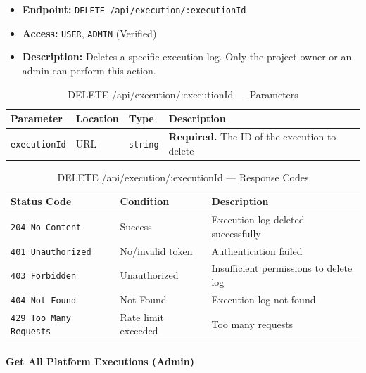 \begin{itemize}
  \item \textbf{Endpoint:} \texttt{DELETE /api/execution/:executionId}
  \item \textbf{Access:} \texttt{USER}, \texttt{ADMIN} (Verified)
  \item \textbf{Description:} Deletes a specific execution log. Only the project owner or an admin can perform this action.
\end{itemize}

\begin{table}[H]
\centering
\renewcommand{\arraystretch}{1.3}
\begin{tabularx}{\textwidth}{|l|l|l|X|}
\hline
\textbf{Parameter} & \textbf{Location} & \textbf{Type} & \textbf{Description} \\
\hline
\texttt{executionId} & URL & \texttt{string} & \textbf{Required.} The ID of the execution to delete \\
\hline
\end{tabularx}
\caption{DELETE /api/execution/:executionId — Parameters}
\label{tab:delete-execution-log-params}
\end{table}

\begin{table}[H]
\centering
\renewcommand{\arraystretch}{1.3}
\begin{tabularx}{\textwidth}{|l|l|X|}
\hline
\textbf{Status Code} & \textbf{Condition} & \textbf{Description} \\
\hline
\texttt{204 No Content}   & Success              & Execution log deleted successfully \\
\hline
\texttt{401 Unauthorized} & No/invalid token     & Authentication failed \\
\hline
\texttt{403 Forbidden}    & Unauthorized         & Insufficient permissions to delete log \\
\hline
\texttt{404 Not Found}    & Not Found            & Execution log not found \\
\hline
\texttt{429 Too Many Requests} & Rate limit exceeded & Too many requests \\
\hline
\end{tabularx}
\caption{DELETE /api/execution/:executionId — Response Codes}
\label{tab:delete-execution-log-responses}
\end{table}
\FloatBarrier

\paragraph{Get All Platform Executions (Admin)}
\label{subsubsec:get-all-platform-executions}

